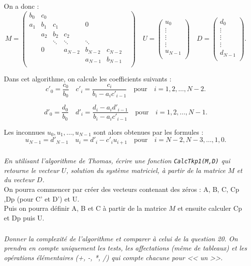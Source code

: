 On a donc : 
$$
M = 
\begin{pmatrix}
b_0 & c_0 &  &  &  &  & \\
a_1 & b_1 & c_1 & &0 & &\\
      & a_2 & b_2 & c_2 & & & \\
& & \ddots & \ddots & \ddots & \\
& 0& & a_{N-2} & b_{N-2} & c_{N-2}\\
& & & & a_{N-1} & b_{N-1}\\
\end{pmatrix}
\quad 
U = \begin{pmatrix}
u_0 \\
\vdots \\
\vdots \\
\vdots  \\
u_{N-1} \\
\end{pmatrix}
\quad 
D = \begin{pmatrix}
d_0 \\
\vdots \\
\vdots \\
\vdots  \\
d_{N-1} \\
\end{pmatrix}.
$$

Dans cet algorithme, on calcule les coefficients suivants : 
$$
c'_0 = \dfrac{c_0}{b_0} \quad c'_i = \dfrac{c_i}{b_i - a_i c'_{i-1}}  \quad \text{pour} \quad i=1,2,\ldots, N-2.$$

$$
d'_0 = \dfrac{d_0}{b_0} \quad d'_i = \dfrac{d_i-a_i d'_{i-1}}{b_i - a_i c'_{i-1}}  \quad \text{pour} \quad i=1,2,\ldots, 
N-1.
$$

Les inconnues $u_0, u_1, \ldots, u_{N-1}$ sont alors obtenues par les formules :
$$
u_{N-1} = d'_{N-1} \quad u_i = d'_i -c'_i u_{i+1} \quad  \text{pour} \quad i=N-2, N-3, \ldots, 1, 0.
$$


\subparagraph{}
\textit{En utilisant l'algorithme de Thomas, écrire une fonction \texttt{CalcTkp1(M,D)} 
qui retourne le vecteur $U$, solution du système matriciel, à partir de la matrice 
$M$ et du vecteur $D$.}\\

On pourra commencer par créer  des vecteurs contenant des zéros :
 A, B, C, Cp ,Dp (pour C' et D') et U.\\
 Puis on pourra  définir A, B et C à partir de la matrice $M$ et ensuite calculer Cp et Dp puis U.


\subparagraph{}
\textit{Donner la complexité de l'algorithme et comparer à celui de la question 20. 
On prendra en compte uniquement les tests, les affectations (même de tableaux)
 et les opérations élémentaires (+, -, *, /) qui compte chacune pour << un >>.}\\
\fi

